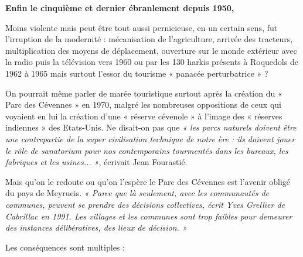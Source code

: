 \textbf{Enfin le cinquième et dernier ébranlement depuis 1950,}

Moins violente mais peut être tout aussi pernicieuse, en un certain sens, fut l’irruption de la
modernité : mécanisation de l’agriculture, arrivée des tracteurs, multiplication des moyens de
déplacement, ouverture sur le monde extérieur avec la radio puis la télévision vers 1960 ou
par les 130 harkis présents à Roquedols de 1962 à 1965 mais surtout l’essor du
tourisme « panacée perturbatrice » ?

On pourrait même parler de marée touristique surtout après la création du « Parc des
Cévennes » en 1970, malgré les nombreuses oppositions de ceux qui voyaient en lui la
création d’une « réserve cévenole » à l’image des « réserves indiennes » des Etats-Unis. Ne
disait-on pas que \emph{« les parcs naturels doivent être une contrepartie de la super civilisation technique de notre
ère : ils doivent jouer le rôle de sanatorium pour nos contemporains tourmentés dans les bureaux, les fabriques
et les usines... »}, écrivait Jean Fourastié.

Mais qu’on le redoute ou qu’on l’espère le Parc des Cévennes est l’avenir obligé du pays de
Meyrueis. \emph{« Parce que là seulement, avec les communautés de communes, peuvent se prendre des décisions
collectives, écrit Yves Grellier de Cabrillac en 1991. Les villages et les communes sont trop faibles pour
demeurer des instances délibératives, des lieux de décision. »}

Les conséquences sont multiples :

